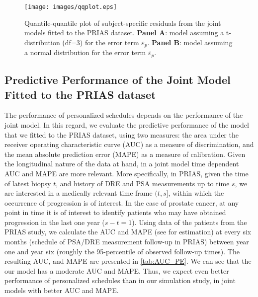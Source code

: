 \begin{figure}[!htb]
\centerline{\texttt{[image: images/qqplot.eps]}}
\caption{Quantile-quantile plot of subject-specific residuals from the joint models fitted to the PRIAS dataset. \textbf{Panel A}: model assuming a t-distribution (df=3) for the error term $\varepsilon_p$. \textbf{Panel B}: model assuming a normal distribution for the error term $\varepsilon_p$.}
\label{fig:qqplot}
\end{figure}

\clearpage
\subsection{Predictive Performance of the Joint Model Fitted to the PRIAS dataset}
The performance of personalized schedules depends on the performance of the joint model. In this regard, we evaluate the predictive performance of the model that we fitted to the PRIAS dataset, using two measures: the area under the receiver operating characteristic curve (AUC) as a measure of discrimination, and the mean absolute prediction error (MAPE) as a measure of calibration. Given the longitudinal nature of the data at hand, in a joint model time dependent AUC and MAPE are more relevant. More specifically, in PRIAS, given the time of latest biopsy $t$, and history of DRE and PSA measurements up to time $s$, we are interested in a medically relevant time frame $(t, s]$, within which the occurrence of progression is of interest. In the case of prostate cancer, at any point in time it is of interest to identify patients who may have obtained progression in the last one year ($s-t = 1$). Using data of the patients from the PRIAS study, we calculate the AUC and MAPE (see \citet{landmarking2017} for estimation) at every six months (schedule of PSA/DRE measurement follow-up in PRIAS) between year one and year six (roughly the 95-percentile of observed follow-up times). The resulting AUC, and MAPE are presented in \ref{tab:AUC_PE}. We can see that the our model has a moderate AUC and MAPE. Thus, we expect even better performance of personalized schedules than in our simulation study, in joint models with better AUC and MAPE.

